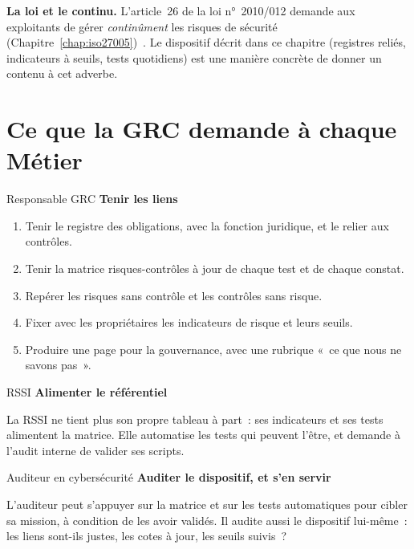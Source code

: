 \begin{boxinfo}
\textbf{La loi et le continu.} L'article~26 de la loi n°~2010/012 demande
aux exploitants de gérer \emph{continûment} les risques de sécurité
(Chapitre~\ref{chap:iso27005})~\cite{loi2010012}. Le dispositif décrit dans
ce chapitre (registres reliés, indicateurs à seuils, tests quotidiens) est
une manière concrète de donner un contenu à cet adverbe.
\end{boxinfo}

\section{Ce que la GRC demande à chaque Métier}
\label{sec:c13-metiers}

\begin{boxmetier}{Responsable GRC}
\textbf{Tenir les liens}
\begin{enumerate}
    \item Tenir le registre des obligations, avec la fonction juridique, et
          le relier aux contrôles.
    \item Tenir la matrice risques-contrôles à jour de chaque test et de
          chaque constat.
    \item Repérer les risques sans contrôle et les contrôles sans risque.
    \item Fixer avec les propriétaires les indicateurs de risque et leurs
          seuils.
    \item Produire une page pour la gouvernance, avec une rubrique «~ce que
          nous ne savons pas~».
\end{enumerate}
\end{boxmetier}

\begin{boxmetier}{RSSI}
\textbf{Alimenter le référentiel}

La RSSI ne tient plus son propre tableau à part~: ses indicateurs et ses
tests alimentent la matrice. Elle automatise les tests qui peuvent l'être,
et demande à l'audit interne de valider ses scripts.
\end{boxmetier}

\begin{boxmetier}{Auditeur en cybersécurité}
\textbf{Auditer le dispositif, et s'en servir}

L'auditeur peut s'appuyer sur la matrice et sur les tests automatiques pour
cibler sa mission, à condition de les avoir validés. Il audite aussi le
dispositif lui-même~: les liens sont-ils justes, les cotes à jour, les
seuils suivis~?
\end{boxmetier}

